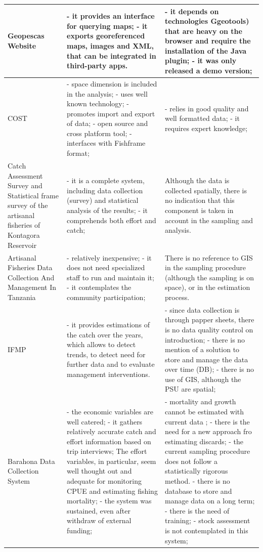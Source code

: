\documentclass[11pt]{article} %
\begin{document}
\begin{center}
\begin{supertabular}{ | p{0.3\textwidth} | p{0.3\textwidth} | p{0.3\textwidth} |}
Geopescas Website & - it provides an interface for querying maps; - it exports georeferenced maps, images and XML, that can be integrated in third-party apps.  & - it depends on technologies Ggeotools) that are heavy on the browser and require the installation of the Java plugin; - it was only released a demo version; \\ \hline
COST & - space dimension is included in the analysis; - uses well known technology; - promotes import and export of data; - open source and cross platform tool; - interfaces with Fishframe format; & - relies in good quality and well formatted data; - it requires expert knowledge; \\ \hline
Catch Assessment Survey and Statistical frame survey of the artisanal fisheries of Kontagora Reservoir & - it is a complete system, including data collection (survey) and statistical analysis of the results; - it comprehends both effort and catch; & Although the data is collected spatially, there is no indication that this component is taken in account in the sampling and analysis. \\ \hline
Artisanal Fisheries Data Collection And Management In Tanzania & - relatively inexpensive; - it does not need specialized staff to run and maintain it; - it contemplates the community participation; & There is no reference to GIS in the sampling procedure (although the sampling is on space), or in the estimation process. \\ \hline
IFMP & - it provides estimations of the catch over the years, which allows to detect trends, to detect need for further data and to evaluate management interventions. & - since data collection is through papper sheets, there is no data quality control on introduction; - there is no mention of a solution to store and manage the data over time (DB); - there is no use of GIS, although the PSU are spatial; \\ \hline
Barahona Data Collection System & - the economic variables are well catered; - it gathers relatively accurate catch and effort information based on trip interviews; The effort variables, in particular, seem well thought out and adequate for monitoring CPUE and estimating fishing mortality; - the system was sustained, even after withdraw of external funding; & - mortality and growth cannot be estimated with current data ; - there is the need for a new approach fro estimating discards; - the current sampling procedure does not follow a statistically rigorous method. - there is no database to store and manage data on a long term; - there is the need of training; - stock assessment is not contemplated in this system; \\ \hline

\end{supertabular}
\end{center}
\end{document}
